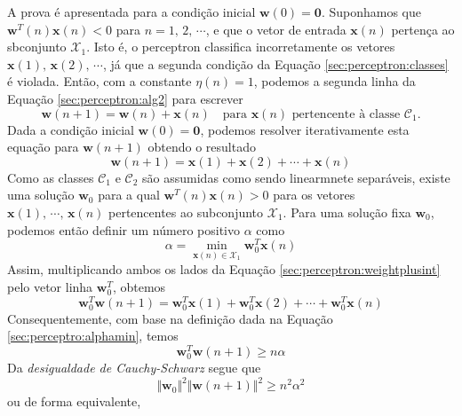 A prova é apresentada para a condição inicial $\textbf{w}(0)=\textbf{0}$. Suponhamos que $\textbf{w}^T(n)\textbf{x}(n) < 0 $ para $n=1,\, 2,\,\cdots$, e que o vetor de entrada $\textbf{x}(n)$ pertença ao sbconjunto $\mathscr{X}_1$. Isto é, o perceptron classifica incorretamente os vetores $\textbf{x}(1),\,\textbf{x}(2),\,\cdots$, já que a segunda condição da Equação \ref{sec:perceptron:classes} é violada. Então, com a constante $\eta(n)=1$, podemos a segunda linha da Equação \ref{sec:perceptron:alg2} para escrever
\begin{equation}\label{sec:perceptron:weightplus}
  \textbf{w}(n+1)=\textbf{w}(n)+\textbf{x}(n)\quad \text{para $\textbf{x}(n)$ pertencente à classe $\mathscr{C}_1$.}
\end{equation}
Dada a condição inicial $\textbf{w}(0)=\textbf{0}$, podemos resolver iterativamente esta equação para $\textbf{w}(n+1)$ obtendo o resultado
\begin{equation}\label{sec:perceptron:weightplusint}
  \textbf{w}(n+1)=\textbf{x}(1)+\textbf{x}(2)+\cdots+\textbf{x}(n)
\end{equation}
Como as classes $\mathscr{C}_1$ e $\mathscr{C}_2$ são assumidas como sendo linearmnete separáveis, existe uma solução $\textbf{w}_0$ para a qual $\textbf{w}^T(n)\textbf{x}(n)>0$ para os vetores $\textbf{x}(1),\,\cdots,\,\textbf{x}(n)$ pertencentes ao subconjunto $\mathscr{X}_1$. Para uma solução fixa $\textbf{w}_0$, podemos então definir um número positivo $\alpha$ como
\begin{equation}\label{sec:perceptro:alphamin}
  \alpha = \min_{\textbf{x}(n)\in \mathscr{X}_1}\textbf{w}_0^T\textbf{x}(n)
\end{equation}
Assim, multiplicando ambos os lados da Equação \ref{sec:perceptron:weightplusint} pelo vetor linha $\textbf{w}_0^T$, obtemos
\begin{equation*}
  \textbf{w}_0^T\textbf{w}(n+1)=\textbf{w}_0^T\textbf{x}(1)+\textbf{w}_0^T\textbf{x}(2)+\cdots+\textbf{w}_0^T\textbf{x}(n)
\end{equation*}
Consequentemente, com base na definição dada na Equação \ref{sec:perceptro:alphamin}, temos
\begin{equation*}
  \textbf{w}_0^T\textbf{w}(n+1) \geq n\alpha
\end{equation*}
Da \textit{desigualdade de Cauchy-Schwarz} segue que
\begin{equation*}
  \Vert \textbf{w}_0\Vert^2\Vert \textbf{w}(n+1) \Vert^2\geq n^2\alpha^2
\end{equation*}
ou de forma equivalente,

